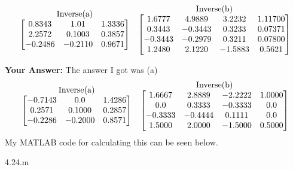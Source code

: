 \documentclass[12pt]{report}
\begin{document}
\begin{itemize}
\[\stackrel{\mbox{Inverse(a)}}{%
\begin{bmatrix}
{0.8343} & {1.01} & {1.3336} \\
{2.2572} & {0.1003} & {0.3857} \\
{-0.2486} & {-0.2110} & {0.9671} 
\end{bmatrix}%
}
\quad
\stackrel{\mbox{Inverse(b)}}{%
\begin{bmatrix}
{1.6777} & {4.9889} & {3.2232} & {1.11700} \\
{0.3443} & {-0.3443} & {0.3233} & {0.07371} \\
{-0.3443} & {-0.2979} & {0.3211} & {0.07800} \\
{1.2480} & {2.1220} & {-1.5883} & {0.5621} 
\end{bmatrix}%
}
\]
\end{itemize}
\textbf{Your Answer:}
\newline
The answer I got was (a) \[
\stackrel{\mbox{Inverse(a)}}{%
\begin{bmatrix}
{-0.7143} & {0.0} & {1.4286} \\
{0.2571} & {0.1000} & {0.2857} \\
{-0.2286} & {-0.2000} & {0.8571} 
\end{bmatrix}%
}
\quad
\stackrel{\mbox{Inverse(b)}}{%
\begin{bmatrix}
{1.6667} & {2.8889} & {-2.2222} & {1.0000} \\
{0.0} & {0.3333} & {-0.3333} & {0.0} \\
{-0.3333} & {-0.4444} & {0.1111} & {0.0} \\
{1.5000} & {2.0000} & {-1.5000} & {0.5000} 
\end{bmatrix}%
}
\]
\newline
\newline
My MATLAB code for calculating this can be seen below.

{4.24.m}
\end{document}
